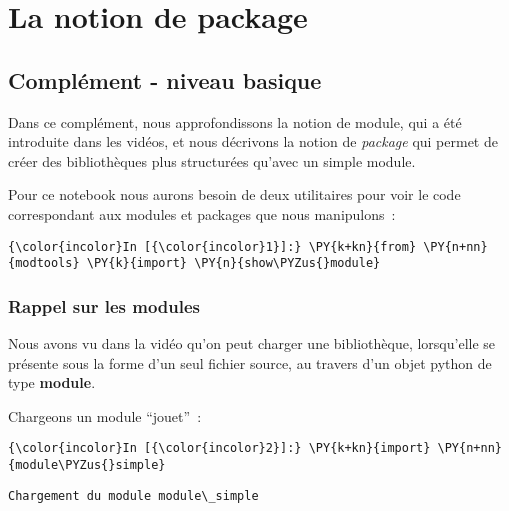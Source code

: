     
    
    
    

    

    \hypertarget{la-notion-de-package}{%
\section{La notion de package}\label{la-notion-de-package}}

    \hypertarget{compluxe9ment---niveau-basique}{%
\subsection{Complément - niveau
basique}\label{compluxe9ment---niveau-basique}}

    Dans ce complément, nous approfondissons la notion de module, qui a été
introduite dans les vidéos, et nous décrivons la notion de
\emph{package} qui permet de créer des bibliothèques plus structurées
qu'avec un simple module.

    Pour ce notebook nous aurons besoin de deux utilitaires pour voir le
code correspondant aux modules et packages que nous manipulons~:

    \begin{Verbatim}[commandchars=\\\{\}]
{\color{incolor}In [{\color{incolor}1}]:} \PY{k+kn}{from} \PY{n+nn}{modtools} \PY{k}{import} \PY{n}{show\PYZus{}module}
\end{Verbatim}


    \hypertarget{rappel-sur-les-modules}{%
\subsubsection{Rappel sur les modules}\label{rappel-sur-les-modules}}

    Nous avons vu dans la vidéo qu'on peut charger une bibliothèque,
lorsqu'elle se présente sous la forme d'un seul fichier source, au
travers d'un objet python de type \textbf{module}.

    Chargeons un module ``jouet''~:

    \begin{Verbatim}[commandchars=\\\{\}]
{\color{incolor}In [{\color{incolor}2}]:} \PY{k+kn}{import} \PY{n+nn}{module\PYZus{}simple}
\end{Verbatim}


    \begin{Verbatim}[commandchars=\\\{\}]
Chargement du module module\_simple

    \end{Verbatim}

